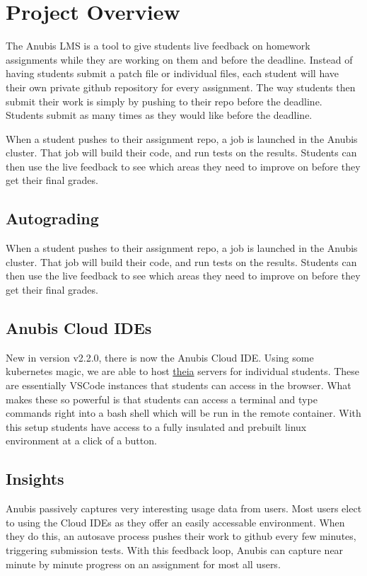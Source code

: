 \chapter{Project Overview}\label{ch:overview}

The Anubis LMS is a tool to give students live feedback on homework
assignments while they are working on them and before the deadline.
Instead of having students submit a patch file or individual files, each student
will have their own private github repository for every assignment.
The way students then submit their work is simply by pushing to their repo before
the deadline.
Students submit as many times as they would like before the deadline.

When a student pushes to their assignment repo, a job is launched in the Anubis cluster.
That job will build their code, and run tests on the results.
Students can then use the live feedback to see which areas they need to improve on
before they get their final grades.

\section{Autograding}\label{sec:autograding}

When a student pushes to their assignment repo, a job is launched in the
Anubis cluster. That job will build their code, and run tests on the results.
Students can then use the live feedback to see which areas they need to improve on
before they get their final grades.


\section{Anubis Cloud IDEs}\label{sec:anubis-cloud-ides}

New in version v2.2.0, there is now the Anubis Cloud IDE. Using some kubernetes magic, we are able to
host \href{https://theia-ide.org/}{theia} servers for individual students. These are essentially VSCode instances
that students can access in the browser. What makes these so powerful is that students can access a terminal
and type commands right into a bash shell which will be run in the remote container. With this setup students
have access to a fully insulated and prebuilt linux environment at a click of a button.


\section{Insights}\label{sec:insights}

Anubis passively captures very interesting usage data from users.
Most users elect to using the Cloud IDEs as they offer an easily accessable environment.
When they do this, an autosave process pushes their work to github every few minutes,
triggering submission tests.
With this feedback loop, Anubis can capture near minute by minute progress on an assignment
for most all users.
